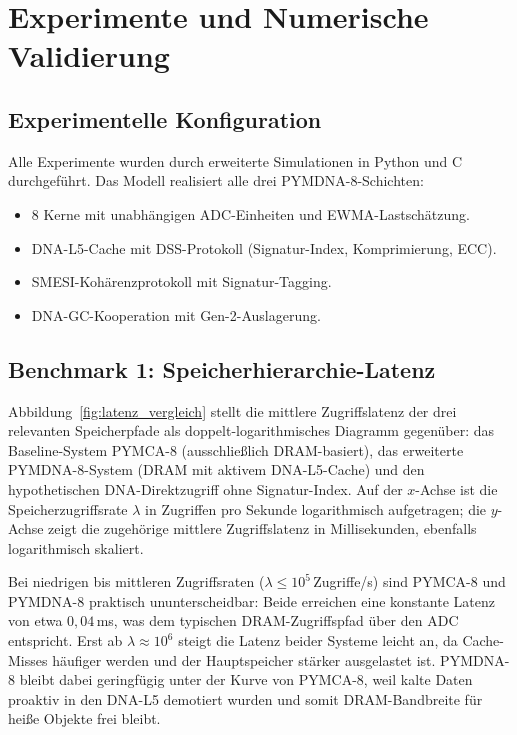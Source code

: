 ﻿\documentclass[a4paper,12pt]{article}
\theoremstyle{definition}
\begin{document}
\section{Experimente und Numerische Validierung}

\subsection{Experimentelle Konfiguration}

Alle Experimente wurden durch erweiterte Simulationen in Python und C
durchgeführt. Das Modell realisiert alle drei PYMDNA-8-Schichten:

\begin{itemize}[noitemsep]
  \item 8 Kerne mit unabhängigen ADC-Einheiten und EWMA-Lastschätzung.
  \item DNA-L5-Cache mit DSS-Protokoll (Signatur-Index, Komprimierung, ECC).
  \item SMESI-Kohärenzprotokoll mit Signatur-Tagging.
  \item DNA-GC-Kooperation mit Gen-2-Auslagerung.
\end{itemize}

\subsection{Benchmark 1: Speicherhierarchie-Latenz}

Abbildung~\ref{fig:latenz_vergleich} stellt die mittlere Zugriffslatenz der drei relevanten Speicherpfade als doppelt-logarithmisches Diagramm gegenüber: das Baseline-System PYMCA-8 (ausschließlich DRAM-basiert), das erweiterte PYMDNA-8-System (DRAM mit aktivem DNA-L5-Cache) und den hypothetischen DNA-Direktzugriff ohne Signatur-Index. Auf der $x$-Achse ist die Speicherzugriffsrate $\lambda$ in Zugriffen pro Sekunde logarithmisch aufgetragen; die $y$-Achse zeigt die zugehörige mittlere Zugriffslatenz in Millisekunden, ebenfalls logarithmisch skaliert.

Bei niedrigen bis mittleren Zugriffsraten ($\lambda \leq 10^5$\,Zugriffe/s) sind PYMCA-8 und PYMDNA-8 praktisch ununterscheidbar: Beide erreichen eine konstante Latenz von etwa $0{,}04$\,ms, was dem typischen DRAM-Zugriffspfad über den ADC entspricht. Erst ab $\lambda \approx 10^6$ steigt die Latenz beider Systeme leicht an, da Cache-Misses häufiger werden und der Hauptspeicher stärker ausgelastet ist. PYMDNA-8 bleibt dabei geringfügig unter der Kurve von PYMCA-8, weil kalte Daten proaktiv in den DNA-L5 demotiert wurden und somit DRAM-Bandbreite für heiße Objekte frei bleibt.
\end{document}
